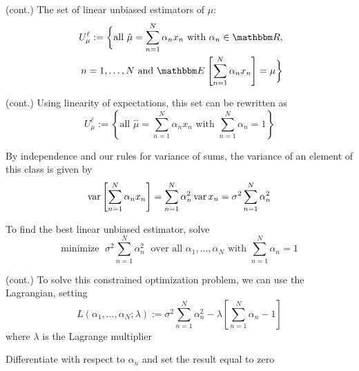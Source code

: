 \begin{frame}

    \vspace{2em}
    \Eg (cont.)
   The set of linear unbiased estimators of $\mu$:
    \begin{align*}
        U^{\ell}_{\mu} := 
        \bigg\{ 
        \text{all } 
        \hat \mu = \sum_{n=1}^N \alpha_n x_n \text{ with }
        \alpha_n \in \RR,\\ \;\; n = 1,\ldots,N
        \text{ and } 
        \EE \left[ \sum_{n=1}^N \alpha_n x_n \right] = \mu
        \bigg\}
    \end{align*}

\end{frame}

\begin{frame}

    \vspace{2em}
    \Eg (cont.)
    Using linearity of expectations, this set can be rewritten as
    \begin{equation*}
        U^{\ell}_{\mu} := 
        \left\{ 
        \text{all } 
        \hat \mu = \sum_{n=1}^N \alpha_n x_n \text{ with }
        \sum_{n=1}^N \alpha_n = 1
        \right\}
    \end{equation*}
    
    By independence and our rules for variance of sums, 
    the variance of an element of this class is given by
    \begin{equation*}
        \operatorname{var} \left[ \sum_{n=1}^N \alpha_n x_n \right]
        =   \sum_{n=1}^N \alpha_n^2 \operatorname{var} x_n 
        =   \sigma^2 \sum_{n=1}^N \alpha_n^2 
    \end{equation*}
    
    \vspace{.7em}
    To find the best linear unbiased estimator, solve
    \begin{equation*}
        \text{minimize } \; \sigma^2 \sum_{n=1}^N \alpha_n^2 \;
        \text{ over all } \alpha_1,\ldots,\alpha_N \text{ with }
        \sum_{n=1}^N \alpha_n = 1
    \end{equation*}
    
\end{frame}

\begin{frame}

    \vspace{2em}
    \Eg (cont.)
    To solve this constrained optimization problem, we can use the Lagrangian,
    setting
    \begin{equation*}
        L(\alpha_1,\ldots,\alpha_N ; \lambda) := \sigma^2 \sum_{n=1}^N \alpha_n^2 - 
        \lambda \left[\sum_{n=1}^N \alpha_n - 1 \right]
    \end{equation*}
    where $\lambda$ is the Lagrange multiplier
    
    
    Differentiate with respect
    to $\alpha_n$ and set the result equal to zero
\end{frame}

